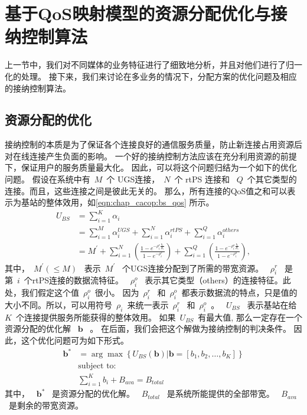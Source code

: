 \section{基于QoS映射模型的资源分配优化与接纳控制算法}
上一节中，我们对不同媒体的业务特征进行了细致地分析，并且对他们进行了归一化的处理。
接下来，我们来讨论在多业务的情况下，分配方案的优化问题及相应的接纳控制算法。
\subsection{资源分配的优化}

接纳控制的本质是为了保证各个连接良好的通信服务质量，防止新连接占用资源后对在线连接产生负面的影响。
一个好的接纳控制方法应该在充分利用资源的前提下，保证用户的服务质量最大化。
因此，可以将这个问题归结为一个如下的优化问题。
假设在系统中有~$M$~个 UGS连接，~$N$~个 rtPS 连接和 ~$Q$~个其它类型的连接。而且，这些连接之间是彼此无关的。
那么，所有连接的QoS值之和可以表示为基站的整体效用，如\eqref{eqn:chap_cacop:bs_qos} 所示。
\begin{align}
U_{BS} &= \displaystyle \sum_{i=1}^K \alpha_i \nonumber \\
&= \sum_{i=1}^M\alpha_i^{UGS} + \sum_{i=1}^N\alpha_i^{rtPS} + \sum_{i=1}^Q\alpha_i^{others} \nonumber \\
&=\displaystyle M^\prime + \sum_{i=1}^N \left( \frac{1- e^{-\rho_i^r
\frac{b_i}{B_i} }}{1-e^{-\rho_i^r}} \right)
 + \sum_{i=1}^Q \left( \frac{1- e^{-\rho_i^o
\frac{b_i}{B_i} }}{1-e^{-\rho_i^o}} \right),
\label{eqn:chap_cacop:bs_qos}
\end{align}
其中，~$M^\prime(\le M)$~ 表示~$M^\prime$~ 个UGS连接分配到了所需的带宽资源。
~$\rho_i^r$~ 是第~$i$~个rtPS连接的数据流特征。 
~$\rho_i^o$~ 表示其它类型（others）的连接特征。此处，我们假定这个值~$\rho_i^o$~很小。
因为~$\rho_i^r$~ 和~$\rho_i^o$~都表示数据流的特点，只是值的大小不同。所以，可以用符号~$\rho_i$~来统一表示~$\rho_i^r$~ 和~$\rho_i^o$~。
~$U_{BS}$~ 表示基站在给~$K$~个连接提供服务所能获得的整体效用。
如果~$U_{BS}$~有最大值, 那么一定存在一个资源分配的优化解
~$\mathbf{b}$~ 。
在后面，我们会把这个解做为接纳控制的判决条件。
因此，这个优化问题可为如下形式。
\begin{align}
\mathbf{b}^* &= \arg \max \left\{ U_{BS}(\mathbf{b}) \big| \mathbf{b} = [b_1, b_2, \dots, b_K] \right\} \label{eqn_u_bs_qos}\\
&\text{subject to:}\nonumber\\
&\displaystyle\sum_{i=1}^{K}b_i + B_{ava}= B_{total} \nonumber
\end{align}
其中， ~$\mathbf{b}^*$~ 是资源分配的优化解。
~$B_{total}$~ 是系统所能提供的全部带宽。
~$ B_{ava} $~是剩余的带宽资源。


